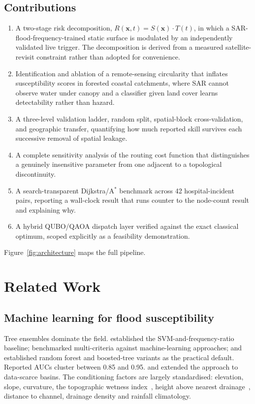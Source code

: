 \documentclass[11pt,a4paper]{article}
\newcommand{\Sx}{S(\mathbf{x})}
\newcommand{\Tt}{T(t)}
\newcommand{\Rxt}{R(\mathbf{x},t)}
\begin{document}
\subsection{Contributions}
\begin{enumerate}
\itemsep2pt
\item A two-stage risk decomposition, $\Rxt=\Sx\cdot\Tt$, in which a
      SAR-flood-frequency-trained static surface is modulated by an independently
      validated live trigger. The decomposition is derived from a measured
      satellite-revisit constraint rather than adopted for convenience.
\item Identification and ablation of a remote-sensing circularity that inflates
      susceptibility scores in forested coastal catchments, where SAR cannot
      observe water under canopy and a classifier given land cover learns
      detectability rather than hazard.
\item A three-level validation ladder, random split, spatial-block
      cross-validation, and geographic transfer, quantifying how much reported
      skill survives each successive removal of spatial leakage.
\item A complete sensitivity analysis of the routing cost function that
      distinguishes a genuinely insensitive parameter from one adjacent to a
      topological discontinuity.
\item A search-transparent Dijkstra/A$^\ast$ benchmark across 42
      hospital-incident pairs, reporting a wall-clock result that runs counter to
      the node-count result and explaining why.
\item A hybrid QUBO/QAOA dispatch layer verified against the exact classical
      optimum, scoped explicitly as a feasibility demonstration.
\end{enumerate}

Figure~\ref{fig:architecture} maps the full pipeline.

\section{Related Work}
\label{sec:related}

\subsection{Machine learning for flood susceptibility}
Tree ensembles dominate the field. \citet{tehrany2014} established the
SVM-and-frequency-ratio baseline; \citet{khosravi2018} benchmarked multi-criteria
against machine-learning approaches; \citet{arabameri2019} and \citet{saha2021}
established random forest and boosted-tree variants as the practical default.
Reported AUCs cluster between 0.85 and 0.95. \citet{wang2020} and
\citet{avand2021} extended the approach to data-scarce basins.
The conditioning factors are largely standardised: elevation, slope, curvature,
the topographic wetness index~\citep{beven1979}, height above nearest
drainage~\citep{renno2008,nobre2011}, distance to channel, drainage density and
rainfall climatology.
\end{document}
